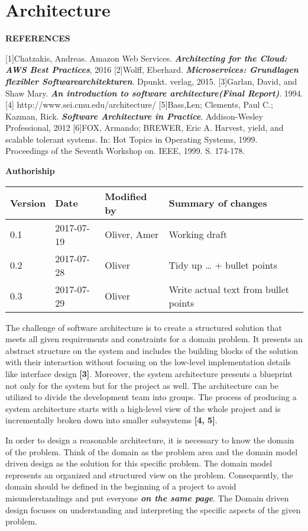 \section{Architecture}\label{architecture}

\textbf{REFERENCES}

{[}1{]}Chatzakis, Andreas. Amazon Web Services.
\textbf{\emph{Architecting for the Cloud: AWS Best Practices}}, 2016
{[}2{]}Wolff, Eberhard. \textbf{\emph{Microservices: Grundlagen
flexibler Softwarearchitekturen}}. Dpunkt. verlag, 2015. {[}3{]}Garlan,
David, and Shaw Mary. \textbf{\emph{An introduction to software
architecture(Final Report)}}. 1994. {[}4{]}
http://www.sei.cmu.edu/architecture/ {[}5{]}Bass,Len; Clements, Paul C.;
Kazman, Rick. \textbf{\emph{Software Architecture in Practice}}.
Addison-Wesley Professional, 2012 {[}6{]}FOX, Armando; BREWER, Eric A.
Harvest, yield, and scalable tolerant systems. In: Hot Topics in
Operating Systems, 1999. Proceedings of the Seventh Workshop on. IEEE,
1999. S. 174-178.

\textbf{Authoriship}

\begin{longtable}[]{@{}llll@{}}
\toprule
Version & Date & Modified by & Summary of changes\tabularnewline
\midrule
\endhead
0.1 & 2017-07-19 & Oliver, Amer & Working draft\tabularnewline
0.2 & 2017-07-28 & Oliver & Tidy up \ldots{} + bullet
points\tabularnewline
0.3 & 2017-07-29 & Oliver & Write actual text from bullet
points\tabularnewline
\bottomrule
\end{longtable}

The challenge of software architecture is to create a structured
solution that meets all given requirements and constraints for a domain
problem. It presents an abstract structure on the system and includes
the building blocks of the solution with their interaction without
focusing on the low-level implementation details like interface design
\textbf{{[}3{]}}. Moreover, the system architecture presents a blueprint
not only for the system but for the project as well. The architecture
can be utilized to divide the development team into groups. The process
of producing a system architecture starts with a high-level view of the
whole project and is incrementally broken down into smaller subsystems
\textbf{{[}4, 5{]}}.

In order to design a reasonable architecture, it is necessary to know
the domain of the problem. Think of the domain as the problem area and
the domain model driven design as the solution for this specific
problem. The domain model represents an organized and structured view on
the problem. Consequently, the domain should be defined in the beginning
of a project to avoid misunderstandings and put everyone
\textbf{\emph{on the same page}}. The Domain driven design focuses on
understanding and interpreting the specific aspects of the given
problem.

